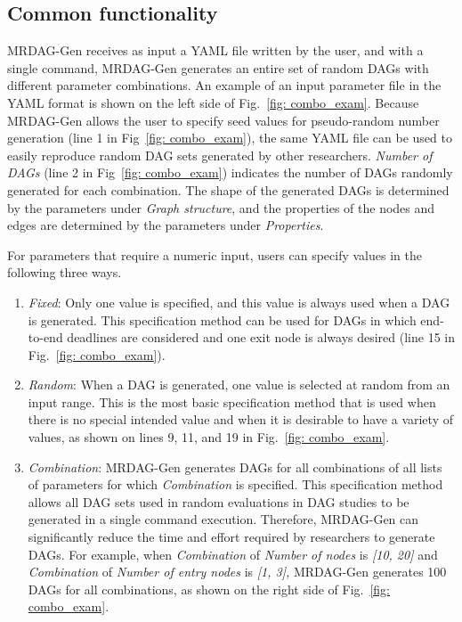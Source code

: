 \subsection{Common functionality}
\label{ssec: common}

MRDAG-Gen receives as input a YAML file written by the user, and with a single command, MRDAG-Gen generates an entire set of random DAGs with different parameter combinations.
An example of an input parameter file in the YAML format is shown on the left side of Fig.~\ref{fig: combo_exam}.
Because MRDAG-Gen allows the user to specify seed values for pseudo-random number generation (line 1 in Fig~\ref{fig: combo_exam}), the same YAML file can be used to easily reproduce random DAG sets generated by other researchers.
    {\it Number of DAGs} (line 2 in Fig~\ref{fig: combo_exam}) indicates the number of DAGs randomly generated for each combination.
The shape of the generated DAGs is determined by the parameters under {\it Graph structure}, and the properties of the nodes and edges are determined by the parameters under {\it Properties}.

For parameters that require a numeric input, users can specify values in the following three ways.
\begin{enumerate}
    \item {\it Fixed}: Only one value is specified, and this value is always used when a DAG is generated. This specification method can be used for DAGs in which end-to-end deadlines are considered and one exit node is always desired (line 15 in Fig.~\ref{fig: combo_exam}).
    \item {\it Random}: When a DAG is generated, one value is selected at random from an input range. This is the most basic specification method that is used when there is no special intended value and when it is desirable to have a variety of values, as shown on lines 9, 11, and 19 in Fig.~\ref{fig: combo_exam}.
    \item {\it Combination}: MRDAG-Gen generates DAGs for all combinations of all lists of parameters for which {\it Combination} is specified. This specification method allows all DAG sets used in random evaluations in DAG studies to be generated in a single command execution. Therefore, MRDAG-Gen can significantly reduce the time and effort required by researchers to generate DAGs. For example, when {\it Combination} of {\it Number of nodes} is {\it [10, 20]} and {\it Combination} of {\it Number of entry nodes} is {\it [1, 3],} MRDAG-Gen generates 100 DAGs for all combinations, as shown on the right side of Fig.~\ref{fig: combo_exam}.
\end{enumerate}

